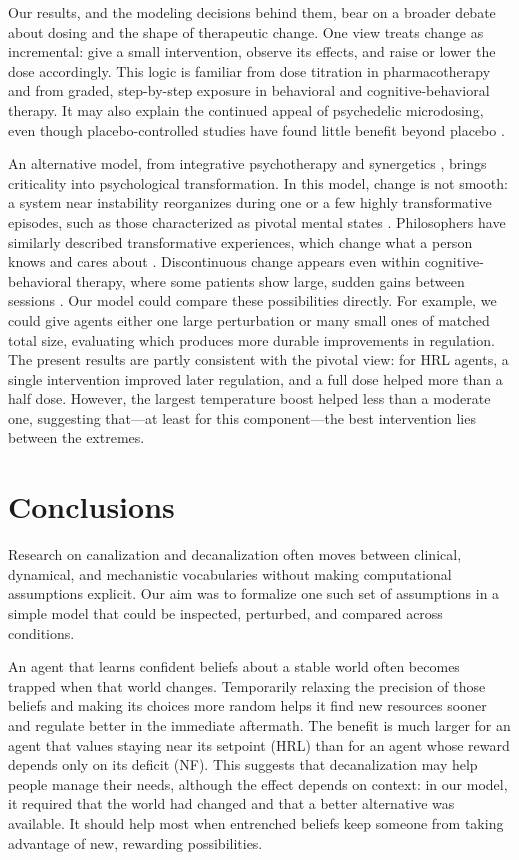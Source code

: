 \documentclass[12pt,fleqn]{article}
\begin{document}
Our results, and the modeling decisions behind them, bear on a broader debate about dosing and the shape of therapeutic change. One view treats change as incremental: give a small intervention, observe its effects, and raise or lower the dose accordingly. This logic is familiar from dose titration in pharmacotherapy and from graded, step-by-step exposure in behavioral and cognitive-behavioral therapy. It may also explain the continued appeal of psychedelic microdosing, even though placebo-controlled studies have found little benefit beyond placebo \citep{szigeti_microdosing_2021, cavanna_microdosing_2022, marschall_psilocybin_2022}. 

An alternative model, from integrative psychotherapy and synergetics \citep{schiepek_self-organization_2014, schiepek_psychotherapy_2017}, brings criticality into psychological transformation. In this model, change is not smooth: a system near instability reorganizes during one or a few highly transformative episodes, such as those characterized as pivotal mental states \citep{brouwer_pivotal_2021}. Philosophers have similarly described transformative experiences, which change what a person knows and cares about \citep{paul_transformative_2014}. Discontinuous change appears even within cognitive-behavioral therapy, where some patients show large, sudden gains between sessions \citep{tang_sudden_1999, hayes_change_2007}. Our model could compare these possibilities directly. For example, we could give agents either one large perturbation or many small ones of matched total size, evaluating which produces more durable improvements in regulation. The present results are partly consistent with the pivotal view: for HRL agents, a single intervention improved later regulation, and a full dose helped more than a half dose. However, the largest temperature boost helped less than a moderate one, suggesting that---at least for this component---the best intervention lies between the extremes. 

\section{Conclusions}

Research on canalization and decanalization often moves between clinical, dynamical, and mechanistic vocabularies without making computational assumptions explicit. Our aim was to formalize one such set of assumptions in a simple model that could be inspected, perturbed, and compared across conditions.

An agent that learns confident beliefs about a stable world often becomes trapped when that world changes. Temporarily relaxing the precision of those beliefs and making its choices more random helps it find new resources sooner and regulate better in the immediate aftermath. The benefit is much larger for an agent that values staying near its setpoint (HRL) than for an agent whose reward depends only on its deficit (NF). This suggests that decanalization may help people manage their needs, although the effect depends on context: in our model, it required that the world had changed and that a better alternative was available. It should help most when entrenched beliefs keep someone from taking advantage of new, rewarding possibilities.
\end{document}
